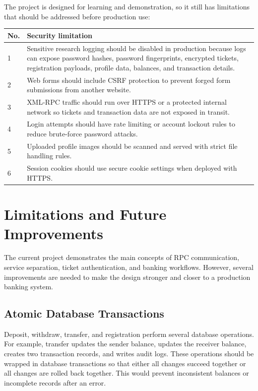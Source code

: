 \documentclass[12pt,a4paper]{article}
\newcommand{\sectionbreakguard}{\Needspace{8\baselineskip}}
\newcommand{\subsectionbreakguard}{\Needspace{5\baselineskip}}
\begin{document}
The project is designed for learning and demonstration, so it still has limitations that should be addressed before production use:

\begin{longtable}{|p{1.2cm}|p{12.8cm}|}
\hline
\textbf{No.} & \textbf{Security limitation} \\
\hline
1 & Sensitive research logging should be disabled in production because logs can expose password hashes, password fingerprints, encrypted tickets, registration payloads, profile data, balances, and transaction details. \\
\hline
2 & Web forms should include CSRF protection to prevent forged form submissions from another website. \\
\hline
3 & XML-RPC traffic should run over HTTPS or a protected internal network so tickets and transaction data are not exposed in transit. \\
\hline
4 & Login attempts should have rate limiting or account lockout rules to reduce brute-force password attacks. \\
\hline
5 & Uploaded profile images should be scanned and served with strict file handling rules. \\
\hline
6 & Session cookies should use secure cookie settings when deployed with HTTPS. \\
\hline
\end{longtable}

\sectionbreakguard
\section{Limitations and Future Improvements}

The current project demonstrates the main concepts of RPC communication, service separation, ticket authentication, and banking workflows. However, several improvements are needed to make the design stronger and closer to a production banking system.

\subsectionbreakguard
\subsection{Atomic Database Transactions}

Deposit, withdraw, transfer, and registration perform several database operations. For example, transfer updates the sender balance, updates the receiver balance, creates two transaction records, and writes audit logs. These operations should be wrapped in database transactions so that either all changes succeed together or all changes are rolled back together. This would prevent inconsistent balances or incomplete records after an error.
\end{document}
